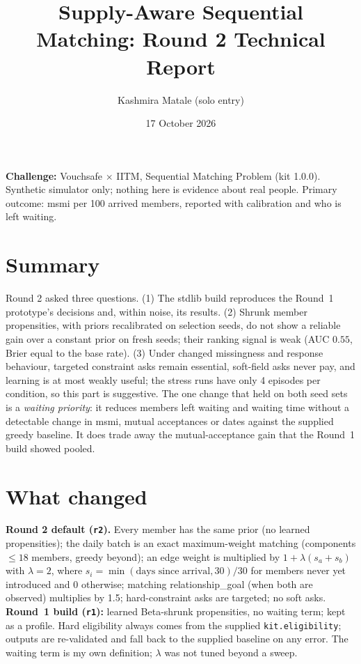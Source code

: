 \documentclass[10pt,a4paper]{article}
\title{Supply-Aware Sequential Matching: Round 2 Technical Report}
\author{Kashmira Matale (solo entry)}\date{17 October 2026}
\begin{document}
\maketitle
\noindent\textbf{Challenge:} Vouchsafe $\times$ IITM, Sequential Matching Problem (kit 1.0.0). Synthetic simulator only; nothing here is evidence about real people. Primary outcome: msmi per 100 arrived members, reported with calibration and who is left waiting.

\section{Summary}
Round 2 asked three questions. (1) The stdlib build reproduces the Round~1 prototype's decisions and, within noise, its results. (2) Shrunk member propensities, with priors recalibrated on selection seeds, do not show a reliable gain over a constant prior on fresh seeds; their ranking signal is weak (AUC $0.55$, Brier equal to the base rate). (3) Under changed missingness and response behaviour, targeted constraint asks remain essential, soft-field asks never pay, and learning is at most weakly useful; the stress runs have only 4 episodes per condition, so this part is suggestive. The one change that held on both seed sets is a \emph{waiting priority}: it reduces members left waiting and waiting time without a detectable change in msmi, mutual acceptances or dates against the supplied greedy baseline. It does trade away the mutual-acceptance gain that the Round~1 build showed pooled.

\section{What changed}
\textbf{Round 2 default (\texttt{r2}).} Every member has the same prior (no learned propensities); the daily batch is an exact maximum-weight matching (components $\le18$ members, greedy beyond); an edge weight is multiplied by $1+\lambda(s_a+s_b)$ with $\lambda=2$, where $s_i=\min(\text{days since arrival},30)/30$ for members never yet introduced and $0$ otherwise; matching relationship\_goal (when both are observed) multiplies by 1.5; hard-constraint asks are targeted; no soft asks. \textbf{Round~1 build (\texttt{r1}):} learned Beta-shrunk propensities, no waiting term; kept as a profile. Hard eligibility always comes from the supplied \texttt{kit.eligibility}; outputs are re-validated and fall back to the supplied baseline on any error. The waiting term is my own definition; $\lambda$ was not tuned beyond a sweep.
\end{document}
